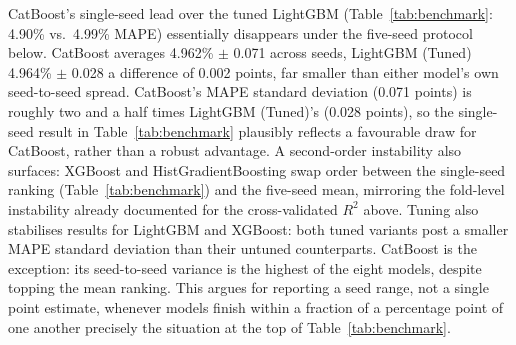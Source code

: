 \documentclass[runningheads]{llncs}
\begin{document}
CatBoost's single-seed lead over the tuned LightGBM (Table~\ref{tab:benchmark}: 4.90\%
vs.\ 4.99\% MAPE) essentially disappears under the five-seed protocol below. CatBoost averages 4.962\%
$\pm$ 0.071 across seeds, LightGBM (Tuned) 4.964\% $\pm$ 0.028 a difference of 0.002
points, far smaller than either model's own seed-to-seed spread. CatBoost's MAPE standard
deviation (0.071 points) is roughly two and a half times LightGBM (Tuned)'s (0.028
points), so the single-seed result in Table~\ref{tab:benchmark} plausibly reflects a
favourable draw for CatBoost, rather than a robust advantage. A second-order instability
also surfaces: XGBoost and HistGradientBoosting swap order between the single-seed
ranking (Table~\ref{tab:benchmark}) and the five-seed mean, mirroring the fold-level
instability already documented for the cross-validated $R^2$ above. Tuning also stabilises results
for LightGBM and XGBoost: both tuned variants post a smaller MAPE standard deviation than
their untuned counterparts. CatBoost is the exception: its seed-to-seed variance is the
highest of the eight models, despite topping the mean ranking. This argues for reporting
a seed range, not a single point estimate, whenever models finish within a fraction of a
percentage point of one another precisely the situation at the top of
Table~\ref{tab:benchmark}.
\end{document}
